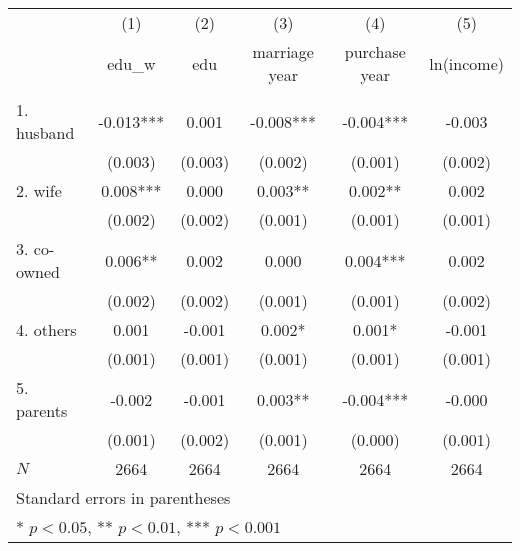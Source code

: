 
\begin{tabular}{l*{5}{c}}
\hline\hline
            &\multicolumn{1}{c}{(1)}&\multicolumn{1}{c}{(2)}&\multicolumn{1}{c}{(3)}&\multicolumn{1}{c}{(4)}&\multicolumn{1}{c}{(5)}\\
            &\multicolumn{1}{c}{edu\_w} &\multicolumn{1}{c}{edu} &\multicolumn{1}{c}{marriage year} &\multicolumn{1}{c}{purchase year} &\multicolumn{1}{c}{ln(income)} \\
\hline
        &                     &                     &                     &                     &                     \\
1. husband  &      -0.013{***}&       0.001         &      -0.008{***}&      -0.004{***}&      -0.003         \\
            &     (0.003)         &     (0.003)         &     (0.002)         &     (0.001)         &     (0.002)         \\
[1em]
2. wife  &       0.008{***}&       0.000         &       0.003{**} &       0.002{**} &       0.002         \\
            &     (0.002)         &     (0.002)         &     (0.001)         &     (0.001)         &     (0.001)         \\
[1em]
3. co-owned  &       0.006{**} &       0.002         &       0.000         &       0.004{***}&       0.002         \\
            &     (0.002)         &     (0.002)         &     (0.001)         &     (0.001)         &     (0.002)         \\
[1em]
4. others  &       0.001         &      -0.001         &       0.002{*}  &       0.001{*}  &      -0.001         \\
            &     (0.001)         &     (0.001)         &     (0.001)         &     (0.001)         &     (0.001)         \\
[1em]
5. parents  &      -0.002         &      -0.001         &       0.003{**} &      -0.004{***}&      -0.000         \\
            &     (0.001)         &     (0.002)         &     (0.001)         &     (0.000)         &     (0.001)         \\
\hline
\(N\)       &        2664         &        2664         &        2664         &        2664         &        2664         \\
\hline\hline
\multicolumn{6}{l}{\footnotesize Standard errors in parentheses}\\
\multicolumn{6}{l}{\footnotesize {*} \(p<0.05\), {**} \(p<0.01\), {***} \(p<0.001\)}\\
\end{tabular}
